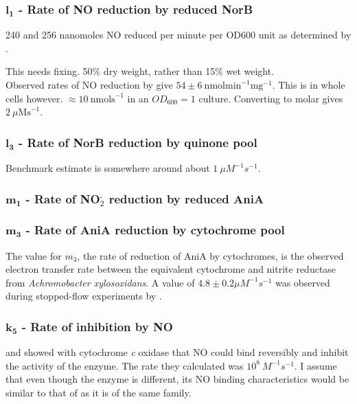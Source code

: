 \subsubsection*{$\mathbf{l_1}$ {\bf- Rate of NO reduction by reduced NorB}}
240 and 256 nanomoles NO reduced per minute per OD600 unit as determined by \citet{Barth2009}.

This needs fixing. 50\% dry weight, rather than 15\% wet weight.\\
Observed rates of NO reduction by \citet{Rock2007} give $54 \pm 6~\mathrm{nmol min}^{-1} \mathrm{mg}^{-1}$. This is in whole cells however.
$\approx 10~\mathrm{nmol s}^{-1}$ in an $OD_{600} = 1$ culture. Converting to molar gives $2~\mu\mathrm{M s}^{-1}$. 

\subsubsection*{$\mathbf{l_3}$ {\bf- Rate of NorB reduction by quinone pool}}
Benchmark estimate is somewhere around about $1~\mu M^{-1}s^{-1}$.

\subsubsection*{$\mathbf{m_1}$ {\bf- Rate of NO$_{\textrm{2}}^{\textrm{-}}$ reduction by reduced AniA}}


\subsubsection*{$\mathbf{m_3}$ {\bf- Rate of AniA reduction by cytochrome pool}}
The value for $m_3$, the rate of reduction of AniA by cytochromes, is the observed electron transfer rate between the equivalent cytochrome and nitrite reductase from \textit{Achromobacter xylosoxidans}. A value of $4.8\pm0.2 \mu M^{-1}s^{-1}$ was observed during stopped-flow experiments by \citet{Nojiri2009}.

\subsubsection*{$\mathbf{k_5}$ {\bf- Rate of \cbbthree{} inhibition by NO}}
\citet{Giuffre2000} and \citet{Blackmore1991} showed with cytochrome \textit{c} oxidase that NO could bind reversibly and inhibit the activity of the enzyme. The rate they calculated was $10^8~M ^{-1} s ^{-1}$. I assume that even though the enzyme is different, its NO binding characteristics would be similar to that of \cbbthree{} as it is of the same family.

